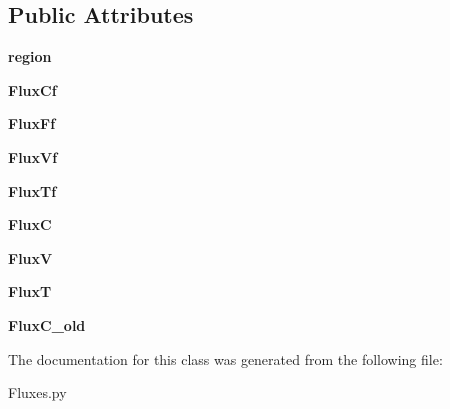 \subsection*{Public Attributes}
\begin{DoxyCompactItemize}
\item 
\mbox{\label{classpy_f_v_m_1_1_fluxes_1_1_fluxes_a0edd208907696ad13f02c6d7c137b22e}} 
{\bfseries region}
\item 
\mbox{\label{classpy_f_v_m_1_1_fluxes_1_1_fluxes_a958e537058d851dce45ee8c61586a17d}} 
{\bfseries Flux\+Cf}
\item 
\mbox{\label{classpy_f_v_m_1_1_fluxes_1_1_fluxes_a09beb803600b00bb6fc5bf864b1674b3}} 
{\bfseries Flux\+Ff}
\item 
\mbox{\label{classpy_f_v_m_1_1_fluxes_1_1_fluxes_a73f9bdfeaa88c9052d8a03205c0230e7}} 
{\bfseries Flux\+Vf}
\item 
\mbox{\label{classpy_f_v_m_1_1_fluxes_1_1_fluxes_a1d1dc1be1beef2c67bb0aed92d598e0e}} 
{\bfseries Flux\+Tf}
\item 
\mbox{\label{classpy_f_v_m_1_1_fluxes_1_1_fluxes_ac4dedd96614aca4d817c0c3b1b003939}} 
{\bfseries FluxC}
\item 
\mbox{\label{classpy_f_v_m_1_1_fluxes_1_1_fluxes_a415305604162bf9703ba6b4419c43c06}} 
{\bfseries FluxV}
\item 
\mbox{\label{classpy_f_v_m_1_1_fluxes_1_1_fluxes_a0d9c50f956dc08b8fe63b6fe8bd92eb0}} 
{\bfseries FluxT}
\item 
\mbox{\label{classpy_f_v_m_1_1_fluxes_1_1_fluxes_aa8d1f742317622315fdfa4c10e4830fa}} 
{\bfseries Flux\+C\+\_\+old}
\end{DoxyCompactItemize}


The documentation for this class was generated from the following file\+:\begin{DoxyCompactItemize}
\item 
Fluxes.\+py\end{DoxyCompactItemize}
